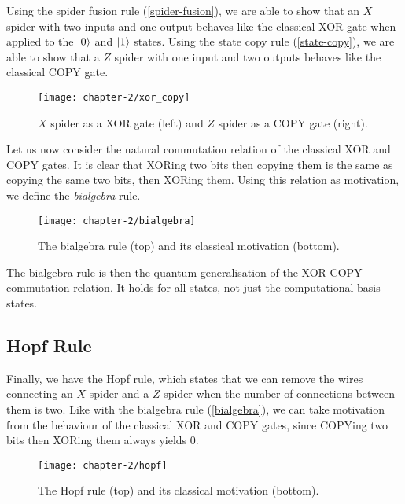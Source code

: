 \begin{center}
\end{center}

Using the spider fusion rule (\ref{spider-fusion}), we are able to show that an $X$ spider with two inputs and one output behaves like the classical XOR gate when applied to the $\ket 0$ and $\ket 1$ states. Using the state copy rule (\ref{state-copy}), we are able to show that a $Z$ spider with one input and two outputs behaves like the classical COPY gate.

\begin{figure}[H]
    \centering
    \texttt{[image: chapter-2/xor\_copy]}
    \caption{$X$ spider as a XOR gate (left) and $Z$ spider as a COPY gate (right).}
\end{figure}

Let us now consider the natural commutation relation of the classical XOR and COPY gates. It is clear that XORing two bits then copying them is the same as copying the same two bits, then XORing them. Using this relation as motivation, we define the \textit{bialgebra} rule.

\begin{figure}[H]
    \centering
    \texttt{[image: chapter-2/bialgebra]}
    \caption{The bialgebra rule (top) and its classical motivation (bottom).}
\end{figure}

The bialgebra rule is then the quantum generalisation of the XOR-COPY commutation relation. It holds for all states, not just the computational basis states.


\subsection{Hopf Rule}%
\label{hopf}

Finally, we have the Hopf rule, which states that we can remove the wires connecting an $X$ spider and a $Z$ spider when the number of connections between them is two. Like with the bialgebra rule (\ref{bialgebra}), we can take motivation from the behaviour of the classical XOR and COPY gates, since COPYing two bits then XORing them always yields 0.

\begin{figure}[H]
    \centering
    \texttt{[image: chapter-2/hopf]}
    \caption{The Hopf rule (top) and its classical motivation (bottom).}
\end{figure}

